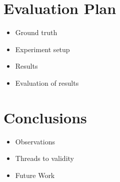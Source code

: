 \documentclass[conference]{IEEEtran}
\begin{document}
\section{Evaluation Plan}
\label{section:evaluation}

\begin{itemize}
    \item Ground truth 
    \item Experiment setup
    \item Results
    \item Evaluation of results
\end{itemize}
\section{Conclusions}\label{section:conclusion}

\begin{itemize}
    \item Observations
    \item Threads to validity
    \item Future Work
\end{itemize}
\end{document}
